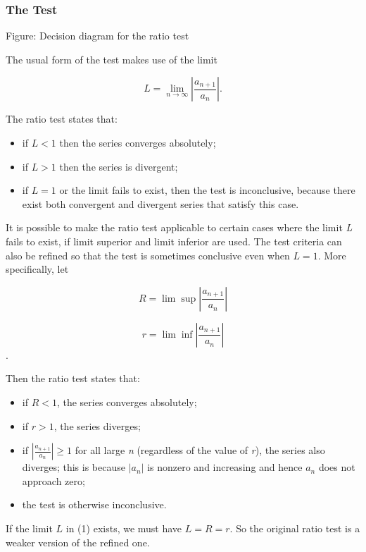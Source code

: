 \subsubsection{The Test}
\label{sss:thet-762c}




Figure: Decision diagram for the ratio test


The usual form of the test makes use of the limit


\[
L = \lim _{n\to\infty}\left|\frac{a _{n+1}}{a_n}\right|.
\]


The ratio test states that:


\begin{itemize}
    \item if $L < 1$ then the series converges absolutely;
    \item if $L > 1$ then the series is divergent;
    \item if $L = 1$ or the limit fails to exist, then the test is inconclusive, because there exist both convergent and divergent series that satisfy this case.
\end{itemize}

It is possible to make the ratio test applicable to certain cases where the limit \textit{L} fails to exist, if limit superior and limit inferior are used. The test criteria can also be refined so that the test is sometimes conclusive even when $L = 1$. More specifically, let


\[
R = \lim\sup \left|\frac{a _{n+1}}{a_n}\right|
\]


\[
r = \lim\inf \left|\frac{a _{n+1}}{a_n}\right|
\].


Then the ratio test states that:


\begin{itemize}
    \item if $R < 1$, the series converges absolutely;
    \item if $r > 1$, the series diverges;
    \item if $\left|\frac{a _{n+1}}{a_n}\right|\ge 1$ for all large \textit{n} (regardless of the value of \textit{r}), the series also diverges; this is because $|a_n|$ is nonzero and increasing and hence $a_n$ does not approach zero;
    \item the test is otherwise inconclusive.
\end{itemize}

If the limit $L$ in (1) exists, we must have $L = R = r$. So the original ratio test is a weaker version of the refined one.


